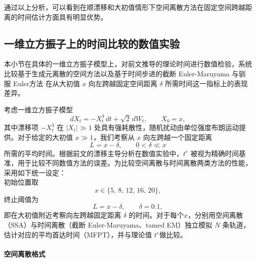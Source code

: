 通过以上分析，可以看到在顺漂移和大初值情形下空间离散方法在固定空间跨越距离的时间估计方面具有明显优势。






\subsection{一维立方振子上的时间比较的数值实验}\label{subsec:cubic-numerics}

本小节在具体的一维立方振子模型上，对前文推导的理论时间进行数值检验，系统比较基于生成元离散的空间方法以及基于时间步进的截断 Euler-Maruyama 与驯服 Euler方法
在从大初值 \(x\) 向左跨越固定空间距离 \(\delta\) 所需时间这一指标上的表现差异。

考虑一维立方振子模型
\begin{equation}\label{eq:cubic-SDE-num}
	dX_t = -X_t^3\,dt + \sqrt{2}\,dW_t,\qquad X_0=x,
\end{equation}
其中漂移项 \(-X_t^3\) 在 \(|X_t| \gg 1 \) 处具有强耗散性，随机扰动由单位强度布朗运动提供。对于给定的大初值 \(x\gg 1\)，我们考察从 \(x\) 向左跨越一个固定距离
\[
L = x - \delta,\qquad 0<\delta\ll x
\]
所需的平均时间。根据前文的漂移主导分析在数值实验中，\(t^e\) 被视为精确时间基准，用于比较不同数值方法的误差。为比较空间离散与时间离散两类方法的性能，采用如下统一设定：\\
初始位置取
	\[
	x\in\{5,\,8,\,12,\,16,\,20\},
	\]
	终止阈值为
	\[
	L=x-\delta,\qquad \delta=0.1,
	\]
即在大初值附近考察向左跨越固定距离 \(\delta\) 的时间。对于每个\(x\)，分别用空间离散（SSA）与时间离散（截断 Euler-Maruyama、tamed EM）独立模拟 \(N\) 条轨道，估计对应的平均首达时间（MFPT），并与理论值 \(t^e\)做比较。


\paragraph{空间离散格式}

